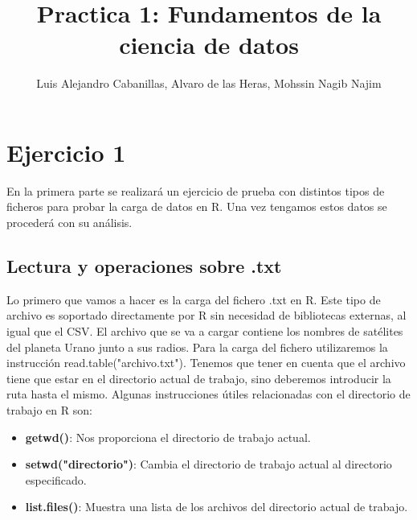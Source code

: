 \documentclass [a4paper] {article}
\title{\textbf{Practica 1: Fundamentos de la ciencia de datos}}
\author{Luis Alejandro Cabanillas, Alvaro de las Heras, Mohssin Nagib Najim}
\begin{document}
\maketitle

\section{Ejercicio 1} En la primera parte se realizará un ejercicio de prueba con distintos tipos de ficheros para probar la 
carga de datos en R. Una vez tengamos estos datos se procederá con su análisis. 

\subsection{Lectura y operaciones sobre .txt} 
Lo primero que vamos a hacer es la carga del fichero .txt en R. Este tipo de archivo es soportado directamente
por R sin necesidad de bibliotecas externas, al igual que el CSV. El archivo que se va a cargar contiene
los nombres de satélites del planeta Urano junto a sus radios. 
Para la carga del fichero utilizaremos la instrucción read.table("archivo.txt"). Tenemos que tener en cuenta que 
el archivo tiene que estar en el directorio actual de trabajo, sino deberemos introducir la ruta hasta el mismo.
Algunas instrucciones útiles relacionadas con el directorio de trabajo en R son:

\begin{itemize}
	\item \textbf{getwd()}: Nos proporciona el directorio de trabajo actual. 
	\item \textbf{setwd("directorio")}: Cambia el directorio de trabajo actual al directorio 
											especificado.
	\item \textbf{list.files()}: Muestra una lista de los archivos del directorio actual de trabajo.
														 
\end{itemize}
\end{document}
